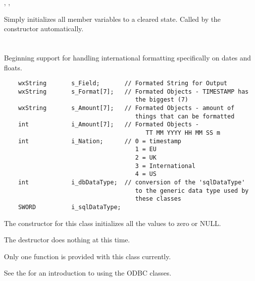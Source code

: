 
,
, 

\label{wxdbcoldefinitialize}

Simply initializes all member variables to a cleared state.  Called by
the constructor automatically.

\section{}\label{wxdbcolfor}

Beginning support for handling international formatting specifically on dates
and floats.

\begin{verbatim}
    wxString       s_Field;       // Formated String for Output
    wxString       s_Format[7];   // Formated Objects - TIMESTAMP has
                                     the biggest (7)
    wxString       s_Amount[7];   // Formated Objects - amount of
                                     things that can be formatted
    int            i_Amount[7];   // Formated Objects -
                                        TT MM YYYY HH MM SS m
    int            i_Nation;      // 0 = timestamp
                                     1 = EU
                                     2 = UK
                                     3 = International
                                     4 = US
    int            i_dbDataType;  // conversion of the 'sqlDataType'
                                     to the generic data type used by
                                     these classes
    SWORD          i_sqlDataType;
\end{verbatim}

The constructor for this class initializes all the values to zero or NULL.

The destructor does nothing at this time.

Only one function is provided with this class currently.

See the  for
an introduction to using the ODBC classes.

\label{wxdbcolforformat}

\label{wxdbcolforformat}


